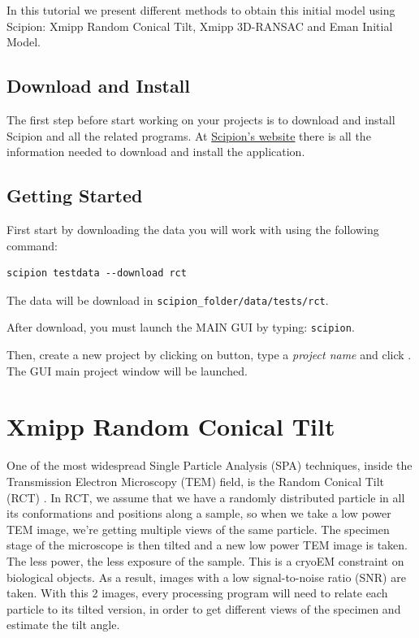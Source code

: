 \documentclass[12pt]{article} %
\begin{document}
In this tutorial we present different methods to obtain this initial
model using Scipion: Xmipp Random Conical Tilt, Xmipp 3D-RANSAC and
Eman Initial Model.

\subsection{Download and Install}

The first step before start working on your projects is to download and
install Scipion and all the related programs. At \href{http://scipionwiki.cnb.csic.es}{Scipion's website} 
there is all the information needed to download and install the application.

\subsection{Getting Started}

First start by downloading the data you will work with using the following command:

\begin{verbatim}
scipion testdata --download rct
\end{verbatim}

The data will be download in \verb+scipion_folder/data/tests/rct+.

After download, you must launch the MAIN GUI by typing: \verb+scipion+.

Then, create a new project by clicking on  button, type a 
\textit{project name} and click . The GUI main project window will be launched.

\section{Xmipp Random Conical Tilt}

One of the most widespread Single Particle Analysis (SPA) techniques, inside the Transmission
Electron Microscopy (TEM) field, is the Random Conical Tilt (RCT) \citep{Radermacher1987a}. 
In RCT, we assume that we have a randomly distributed particle in all its conformations and positions 
along a sample, so when we take a low power TEM image, we’re getting multiple views of the same particle. 
The specimen stage of the microscope is then tilted and a new low power TEM image is taken. 
The less power, the less exposure of the sample. This is a cryoEM constraint on biological objects. 
As a result, images with a low signal-to-noise ratio (SNR) are taken. With this 2 images, 
every processing program will need to relate each particle to its tilted version, 
in order to get different views of the specimen and estimate the tilt angle.
\end{document}
